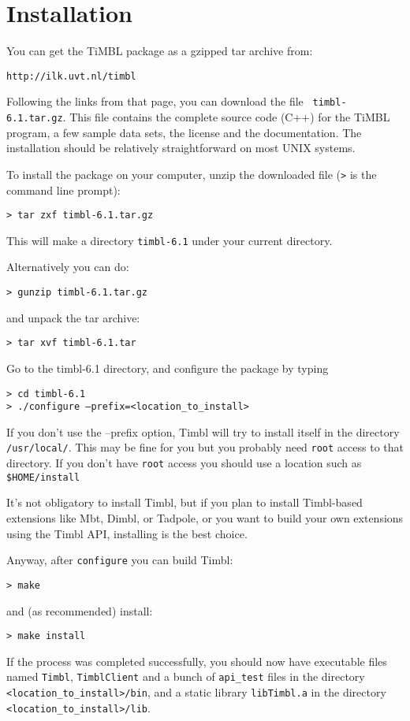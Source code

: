 \documentclass{report}
\begin{document}
\pagestyle{headings}

\chapter{Installation}
\vspace{-1cm}
You can get the TiMBL package as a gzipped tar archive from:

{\tt http://ilk.uvt.nl/timbl}

Following the links from that page, you can download the file {\tt
  timbl-6.1.tar.gz}. This file contains the complete source code (C++)
for the TiMBL program, a few sample data sets, the license and the
documentation. The installation should be relatively straightforward
on most UNIX systems.

To install the package on your computer, unzip the downloaded file
({\tt >} is the command line prompt):

{\tt > tar zxf timbl-6.1.tar.gz}

This will make a directory {\tt timbl-6.1} under your current directory.

Alternatively you can do:

{\tt > gunzip timbl-6.1.tar.gz}

and unpack the tar archive:

{\tt > tar xvf timbl-6.1.tar}

Go to the timbl-6.1 directory, and configure the package by typing

{\tt > cd timbl-6.1} \\
{\tt > ./configure --prefix=<location\_to\_install>}

If you don't use the --prefix option, Timbl will try to install itself
in the directory {\tt /usr/local/}. This may be fine for you but you
probably need {\tt root} access to that directory.
If you don't have {\tt root} access you should use a location such as
{\tt \$HOME/install}

It's not obligatory to install Timbl, but if you plan to install
Timbl-based extensions like Mbt, Dimbl, or Tadpole, or you want to
build your own extensions using the Timbl API, installing is the best
choice.

Anyway, after {\tt configure} you can build Timbl:

{\tt > make}

and (as recommended) install:

{\tt > make install }

If the process was completed successfully, you should now have
executable files named {\tt Timbl}, {\tt TimblClient} and a bunch of
{\tt api\_test} files in the directory {\tt <location\_to\_install>/bin},
and a static library {\tt libTimbl.a} in the directory {\tt <location\_to\_install>/lib}.
\end{document}

